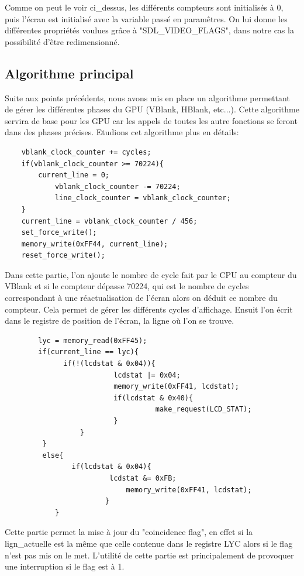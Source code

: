 \documentclass{report}
\begin{document}
Comme on peut le voir ci_dessus, les différents compteurs sont initialisés à 0, puis l'écran est initialisé avec la variable passé en paramêtres. On lui donne les différentes propriétés voulues grâce à "SDL_VIDEO_FLAGS", dans notre cas la possibilité d'être redimensionné.\\

\subsection{Algorithme principal}
	Suite aux points précédents, nous avons mis en place un algorithme permettant de gérer les différentes phases du GPU (VBlank, HBlank, etc...). Cette algorithme servira de base pour les GPU car les appels de toutes les autre fonctions se feront dans des phases précises. Etudions cet algorithme plus en détails:\\

\begin{lstlisting}
	vblank_clock_counter += cycles;
	if(vblank_clock_counter >= 70224){
		current_line = 0;
      		vblank_clock_counter -= 70224;
        	line_clock_counter = vblank_clock_counter;
	}
	current_line = vblank_clock_counter / 456;
	set_force_write();
	memory_write(0xFF44, current_line);
	reset_force_write();
\end{lstlisting}	

Dans cette partie, l'on ajoute le nombre de cycle fait par le CPU au compteur du VBlank et si le compteur dépasse 70224, qui est le nombre de cycles correspondant à une réactualisation de l'écran alors on déduit ce nombre du compteur. Cela permet de gérer les différents cycles d'affichage. Ensuit l'on écrit dans le registre de position de l'écran, la ligne où l'on se trouve.

\begin{lstlisting}                                        
     	lyc = memory_read(0xFF45);
        if(current_line == lyc){                        
          	  if(!(lcdstat & 0x04)){                  
                       	  lcdstat |= 0x04;
                          memory_write(0xFF41, lcdstat);
                          if(lcdstat & 0x40){
    	                            make_request(LCD_STAT);
                          }
                  }
         }
         else{
             	if(lcdstat & 0x04){
       		             lcdstat &= 0xFB;
                             memory_write(0xFF41, lcdstat);
                        }
         	}

\end{lstlisting}
Cette partie permet la mise à jour du "coincidence flag", en effet si la lign_actuelle est la même que celle contenue dans le registre LYC alors si le flag n'est pas mis on le met. L'utilité de cette partie est principalement de provoquer une interruption si le flag est à 1.
\end{document}
